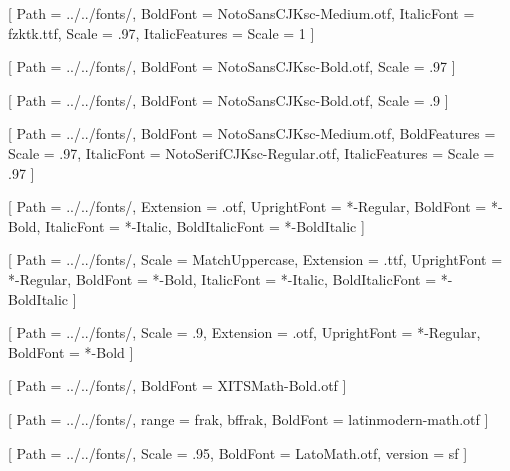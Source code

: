 \usepackage{geometry}
\geometry{
    paperwidth = 155mm,
    paperheight = 235mm,
    outer = 20mm,
    inner = 20mm,
    top = 25mm,
    bottom = 20mm
}

\usepackage[PunctStyle=kaiming]{xeCJK}
\usepackage{amsmath}
\usepackage{unicode-math}

[
    Path            = ../../fonts/,
    BoldFont        = NotoSansCJKsc-Medium.otf,
    ItalicFont      = fzktk.ttf,
    Scale           = .97,
    ItalicFeatures  = {Scale = 1}
]

[
    Path            = ../../fonts/,
    BoldFont        = NotoSansCJKsc-Bold.otf,
    Scale           = .97
]

[
    Path            = ../../fonts/,
    BoldFont        = NotoSansCJKsc-Bold.otf,
    Scale           = .9
]

[
    Path            = ../../fonts/,
    BoldFont        = NotoSansCJKsc-Medium.otf,
    BoldFeatures    = {Scale = .97},
    ItalicFont      = NotoSerifCJKsc-Regular.otf,
    ItalicFeatures  = {Scale = .97}
]

\setmainfont{XITS}[
    Path            = ../../fonts/,
    Extension       = .otf,
    UprightFont     = *-Regular,
    BoldFont        = *-Bold,
    ItalicFont      = *-Italic,
    BoldItalicFont  = *-BoldItalic
]

\setsansfont{Lato}[
    Path            = ../../fonts/,
    Scale           = MatchUppercase,
    Extension       = .ttf,
    UprightFont     = *-Regular,
    BoldFont        = *-Bold,
    ItalicFont      = *-Italic,
    BoldItalicFont  = *-BoldItalic
]

\setmonofont{FiraMono}[
    Path            = ../../fonts/,
    Scale           = .9,
    Extension       = .otf,
    UprightFont     = *-Regular,
    BoldFont        = *-Bold
]

[
    Path            = ../../fonts/,
    BoldFont        = XITSMath-Bold.otf
]

[
    Path            = ../../fonts/,
    range           = {frak, bffrak},
    BoldFont        = latinmodern-math.otf
]

[
    Path            = ../../fonts/,
    Scale           = .95,
    BoldFont        = LatoMath.otf,
    version         = sf
]

